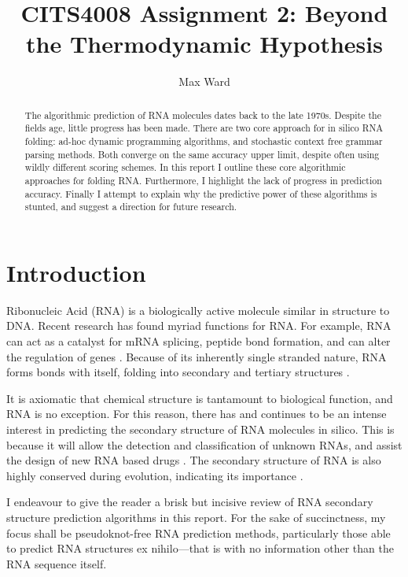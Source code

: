 \documentclass[12pt, a4paper]{article}
\title{CITS4008 Assignment 2: Beyond the Thermodynamic Hypothesis}
\author{Max Ward}
\begin{document}
\maketitle

\begin{abstract}
The algorithmic prediction of RNA molecules dates back to the late 1970s. Despite the fields age, little progress has been made. There are two core approach for in silico RNA folding: ad-hoc dynamic programming algorithms, and stochastic context free grammar parsing methods. Both converge on the same accuracy upper limit, despite often using wildly different scoring schemes. In this report I outline these core algorithmic approaches for folding RNA. Furthermore, I highlight the lack of progress in prediction accuracy. Finally I attempt to explain why the predictive power of these algorithms is stunted, and suggest a direction for future research.
\end{abstract}

\tableofcontents
\clearpage

\section*{Introduction} 
Ribonucleic Acid (RNA) is a biologically active molecule similar in structure to DNA. Recent research has found myriad functions for RNA. For example, RNA can act as a catalyst for mRNA splicing, peptide bond formation, and can alter the regulation of genes
\cite{xu2012statistical}. Because of its inherently single stranded nature, RNA forms bonds with itself, folding into
secondary and tertiary structures \cite{conn1998rna}.

It is axiomatic that chemical structure is tantamount to biological function, and RNA is no exception. For this reason, there has and continues to be an intense
interest in predicting the secondary structure of RNA
molecules in silico. This is because it will allow the detection and classification of unknown RNAs, and assist the design of new RNA based drugs \cite{condon2003problems}. The secondary structure of RNA
is also highly conserved during evolution, indicating its importance \cite{hofacker2008rna}.

I endeavour to give the reader a brisk but incisive review of RNA secondary structure prediction algorithms in this report. For the sake of succinctness, my focus shall be pseudoknot-free RNA prediction methods, particularly those able to predict RNA structures ex nihilo---that is with no information other than the RNA sequence itself.
\end{document}
